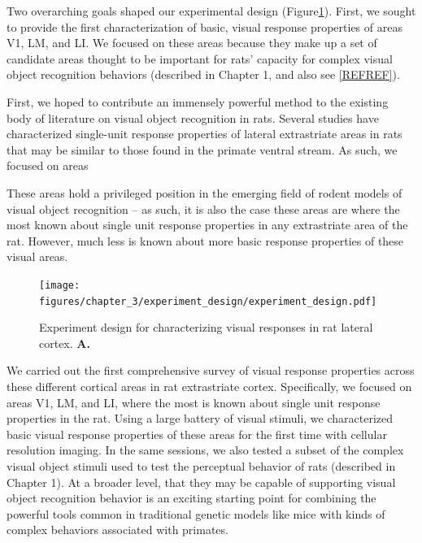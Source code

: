 Two overarching goals shaped our experimental design (Figure\ref{fig:experiment_design}). First, we sought to provide the first characterization of basic, visual response properties of areas V1, LM, and LI. We focused on these areas because they make up a set of candidate areas thought to be important for rats' capacity for complex visual object recognition behaviors (described in Chapter 1, and also see \ref{REFREF}). 

First, we hoped to contribute an immensely powerful method to the existing body of literature on visual object recognition in rats. Several studies have characterized single-unit response properties of lateral extrastriate areas in rats that may be similar to those found in the primate ventral stream\cite{Tafazoli2017, Vermaercke2014, VinkenX, Vermaerke2015}. As such, we focused on areas 


These areas hold a privileged position in the emerging field of rodent models of visual object recognition -- as such, it is also the case these areas are where the most known about single unit response properties in any extrastriate area of the rat\cite{Vermaercke2014, Tafazoli2017, Vinken2016, REFREF}. However, much less is known about more basic response properties of these visual areas. 

\begin{figure}
    \texttt{[image: figures/chapter\_3/experiment\_design/experiment\_design.pdf]}
    \vspace{.1in}
    \caption[Experiment design]{Experiment design for characterizing visual responses in rat lateral cortex. \textbf{A.} 
    \label{fig:experiment_design}}
\end{figure}


We carried out the first comprehensive survey of visual response properties across these different cortical areas in rat extrastriate cortex. Specifically, we focused on areas V1, LM, and LI, where the most is known about single unit response properties in the rat. Using a large battery of visual stimuli, we characterized basic visual response properties of these areas for the first time with cellular resolution imaging. In the same sessions, we also tested a subset of the complex visual object stimuli used to test the perceptual behavior of rats (described in Chapter 1). At a broader level, that they may be capable of supporting visual object recognition behavior is an exciting starting point for combining the powerful tools common in traditional genetic models like mice with kinds of complex behaviors associated with primates.  




